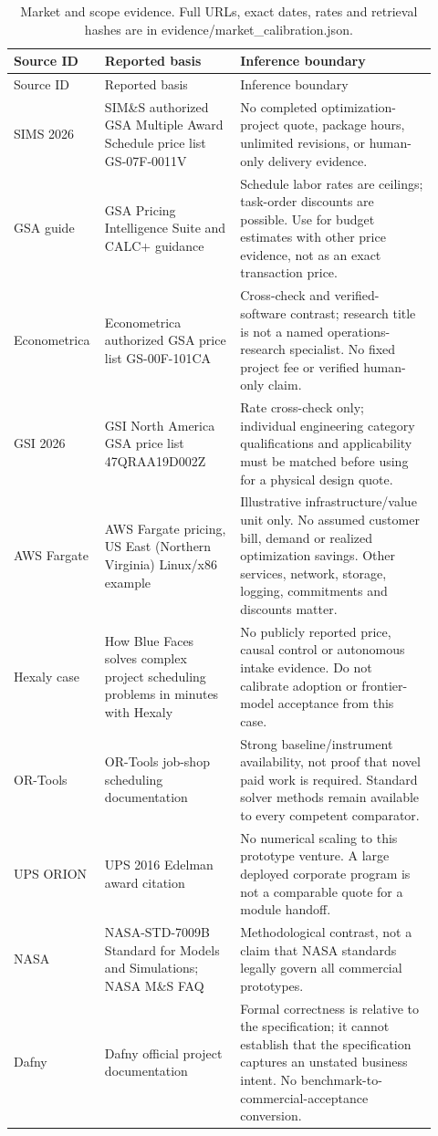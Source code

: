 \begingroup\small\begin{longtable}{>{\raggedright\arraybackslash}p{0.16\linewidth}>{\raggedright\arraybackslash}p{0.31\linewidth}>{\raggedright\arraybackslash}p{0.45\linewidth}}
\caption{Market and scope evidence. Full URLs, exact dates, rates and retrieval hashes are in evidence/market\_calibration.json.}\\
\toprule
Source ID & Reported basis & Inference boundary\\\midrule
\endfirsthead\toprule
Source ID & Reported basis & Inference boundary\\\midrule
\endhead
SIMS 2026 & SIM\&S authorized GSA Multiple Award Schedule price list GS-07F-0011V & No completed optimization-project quote, package hours, unlimited revisions, or human-only delivery evidence.\\
GSA guide & GSA Pricing Intelligence Suite and CALC+ guidance & Schedule labor rates are ceilings; task-order discounts are possible. Use for budget estimates with other price evidence, not as an exact transaction price.\\
Econometrica & Econometrica authorized GSA price list GS-00F-101CA & Cross-check and verified-software contrast; research title is not a named operations-research specialist. No fixed project fee or verified human-only claim.\\
GSI 2026 & GSI North America GSA price list 47QRAA19D002Z & Rate cross-check only; individual engineering category qualifications and applicability must be matched before using for a physical design quote.\\
AWS Fargate & AWS Fargate pricing, US East (Northern Virginia) Linux/x86 example & Illustrative infrastructure/value unit only. No assumed customer bill, demand or realized optimization savings. Other services, network, storage, logging, commitments and discounts matter.\\
Hexaly case & How Blue Faces solves complex project scheduling problems in minutes with Hexaly & No publicly reported price, causal control or autonomous intake evidence. Do not calibrate adoption or frontier-model acceptance from this case.\\
OR-Tools & OR-Tools job-shop scheduling documentation & Strong baseline/instrument availability, not proof that novel paid work is required. Standard solver methods remain available to every competent comparator.\\
UPS ORION & UPS 2016 Edelman award citation & No numerical scaling to this prototype venture. A large deployed corporate program is not a comparable quote for a module handoff.\\
NASA & NASA-STD-7009B Standard for Models and Simulations; NASA M\&S FAQ & Methodological contrast, not a claim that NASA standards legally govern all commercial prototypes.\\
Dafny & Dafny official project documentation & Formal correctness is relative to the specification; it cannot establish that the specification captures an unstated business intent. No benchmark-to-commercial-acceptance conversion.\\
\bottomrule
\end{longtable}\endgroup
